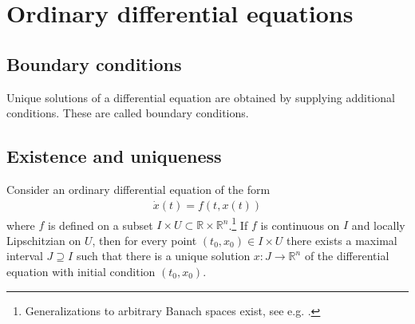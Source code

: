\chapter{Ordinary differential equations}

\section{Boundary conditions}

    Unique solutions of a differential equation are obtained by supplying additional conditions. These are called boundary conditions.




\section{Existence and uniqueness}

    \begin{theorem}\label{diffeq:picard_lindelof}
        Consider an ordinary differential equation of the form
        \begin{gather}
            \dot{x}(t) = f(t, x(t))
        \end{gather}
        where $f$ is defined on a subset $I\times U\subset\mathbb{R}\times\mathbb{R}^n$.\footnote{Generalizations to arbitrary Banach spaces exist, see e.g. \cite{AMP1}.} If $f$ is continuous on $I$ and locally Lipschitzian on $U$, then for every point $(t_0, x_0)\in I\times U$ there exists a maximal interval $J\supseteq I$ such that there is a unique solution $x:J\rightarrow\mathbb{R}^n$ of the differential equation with initial condition $(t_0, x_0)$.
    \end{theorem}

